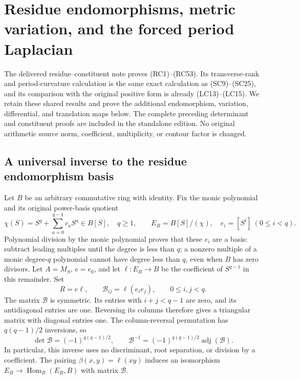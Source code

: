 \documentclass{article}
\begin{document}
\maketitle
\section{Residue endomorphisms, metric variation, and the forced period Laplacian}
\label{sec:residue-constituent-extension}

The delivered residue--constituent note proves (RC1)--(RC53).
Its transverse-rank and period-curvature calculation is the same exact
calculation as (SC9)--(SC25), and its comparison with the original positive
form is already (LC13)--(LC15). We retain these shared results and prove
the additional endomorphism, variation, differential, and translation
maps below. The complete preceding determinant and constituent proofs
are included in the standalone edition. No original arithmetic source
norm, coefficient, multiplicity, or contour factor is changed.

\subsection{A universal inverse to the residue endomorphism basis}

Let \(B\) be an arbitrary commutative ring with identity. Fix the monic
polynomial and its original power-basis quotient
\[
 \chi(S)=S^q+\sum_{a=0}^{q-1}c_aS^a\in B[S],\quad q\ge1,\qquad
 E_B=B[S]/(\chi),\quad e_i=[S^i]\ (0\le i<q).
 \tag{RCX1}
\]
Polynomial division by the monic polynomial proves that these \(e_i\)
are a basis: subtract leading multiples until the degree is less than
\(q\); a nonzero multiple of a monic degree-\(q\) polynomial cannot
have degree less than \(q\), even when \(B\) has zero divisors.
Let \(A=M_S\), \(e=e_0\), and let
\(\ell:E_B\to B\) be the coefficient of \(S^{q-1}\) in this remainder.
Set
\[
 R=e\ell,\qquad
 \mathcal B_{ij}=\ell(e_ie_j),\qquad 0\le i,j<q.
 \tag{RCX2}
\]
The matrix \(\mathcal B\) is symmetric. Its entries with \(i+j<q-1\)
are zero, and its antidiagonal entries are one. Reversing its columns
therefore gives a triangular matrix with diagonal entries one. The
column-reversal permutation has \(q(q-1)/2\) inversions, so
\[
 \det\mathcal B=(-1)^{q(q-1)/2},\qquad
 \mathcal B^{-1}=(-1)^{q(q-1)/2}\operatorname{adj}(\mathcal B).
 \tag{RCX3}
\]
In particular, this inverse uses no discriminant, root separation, or
division by a coefficient. The pairing
\(\beta(x,y)=\ell(xy)\) induces an isomorphism
\(E_B\to\operatorname{Hom}_B(E_B,B)\) with matrix \(\mathcal B\).
\end{document}
